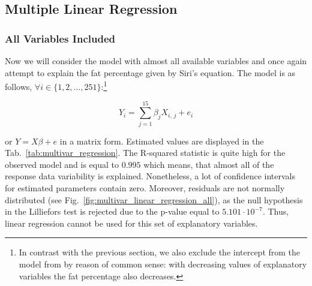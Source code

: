 \documentclass[11pt,american,american]{article}
\begin{document}
\subsection{Multiple Linear Regression}

\subsubsection{All Variables Included}

Now we will consider the model with almost all available variables and once again attempt to explain the fat percentage given by Siri's equation. The model is as follows, $\forall i \in \{1,2, \dots, 251\}$:\footnote{In contrast with the previous section, we also exclude the intercept from the model from by reason of common sense: with decreasing values of explanatory variables the fat percentage also decreases.}

\begin{equation}
	Y_{i} = \sum_{j = 1}^{15}\beta_{j} X_{i,\,j} + e_{i}
\end{equation}

\noindent
\medskip

or $Y = X \beta + e$ in a matrix form. Estimated values are displayed in the Tab.~\ref{tab:multivar_regression}. The R-squared statistic is quite high for the observed model and is equal to $0.995$ which means, that almost all of the response data variability is explained. Nonetheless, a lot of confidence intervals for estimated parameters contain zero. Moreover, residuals are not normally distributed (see Fig.~\ref{fig:multivar_linear_regression_all}), as the null hypothesis in the Lilliefors test is rejected due to the p-value equal to $5.101 \cdot 10^{-7}$. Thus, linear regression cannot be used for this set of explanatory variables.
\end{document}
